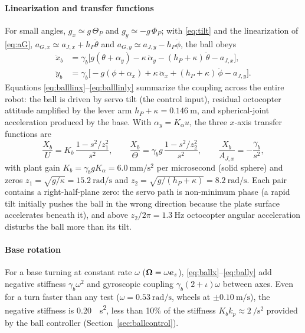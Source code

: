 \paragraph{Linearization and transfer functions}
For small angles, $g_x\simeq g\,\Theta_P$ and $g_y\simeq-g\,\Phi_P$; with \eqref{eq:tilt} and the linearization of \eqref{eq:aG}, $a_{G,x}\simeq a_{J,x}+h_P\ddot\theta$ and $a_{G,y}\simeq a_{J,y}-h_P\ddot\phi$, the ball obeys
\begin{align}
  \ddot x_b&=\gamma_b\Big[g(\theta+\alpha_y)-\kappa\,\ddot\alpha_y-(h_P+\kappa)\,\ddot\theta-a_{J,x}\Big], \label{eq:balllinx}\\
  \ddot y_b&=\gamma_b\Big[-g(\phi+\alpha_x)+\kappa\,\ddot\alpha_x+(h_P+\kappa)\,\ddot\phi-a_{J,y}\Big]. \label{eq:balllinly}
\end{align}
Equations \eqref{eq:balllinx}--\eqref{eq:balllinly} summarize the coupling across the entire robot: the ball is driven by servo tilt (the control input), residual octocopter attitude amplified by the lever arm $h_P+\kappa=\SI{0.146}{\metre}$, and spherical-joint acceleration produced by the base. With $\alpha_y=K_\alpha u$, the three $x$-axis transfer functions are
\begin{equation}
  \frac{X_b}{U}=K_b\,\frac{1-s^2/z_1^2}{s^2},\qquad
  \frac{X_b}{\Theta}=\gamma_b g\,\frac{1-s^2/z_2^2}{s^2},\qquad
  \frac{X_b}{A_{J,x}}=-\frac{\gamma_b}{s^2},
  \label{eq:balltf}
\end{equation}
with plant gain $K_b=\gamma_bgK_\alpha=\SI{6.0}{\milli\metre\per\second\squared}$ per microsecond (solid sphere) and zeros $z_1=\sqrt{g/\kappa}=\SI{15.2}{\radian\per\second}$ and $z_2=\sqrt{g/(h_P+\kappa)}=\SI{8.2}{\radian\per\second}$. Each pair contains a right-half-plane zero: the servo path is non-minimum phase (a rapid tilt initially pushes the ball in the wrong direction because the plate surface accelerates beneath it), and above $z_2/2\pi=\SI{1.3}{\hertz}$ octocopter angular acceleration disturbs the ball more than its tilt.

\paragraph{Base rotation}
For a base turning at constant rate $\omega$ ($\bm{\Omega}=\omega\bm{e}_z$), \eqref{eq:ballx}--\eqref{eq:bally} add negative stiffness $\gamma_b\omega^2$ and gyroscopic coupling $\gamma_b(2+\iota)\omega$ between axes. Even for a turn faster than any test ($\omega=\SI{0.53}{\radian\per\second}$, wheels at $\pm\SI{0.10}{\metre\per\second}$), the negative stiffness is \SI{0.20}{\per\second\squared}, less than 10\% of the stiffness $K_bk_p\approx\SI{2}{\per\second\squared}$ provided by the ball controller (Section~\ref{sec:ballcontrol}).
